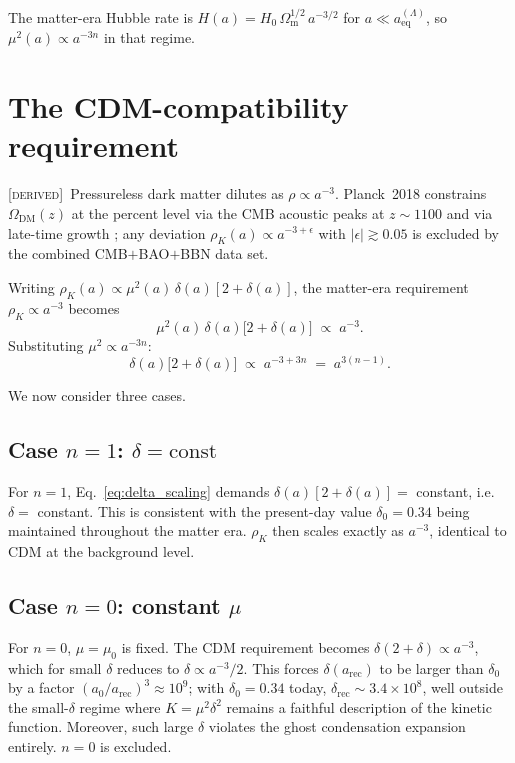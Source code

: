 \documentclass[prd,twocolumn,superscriptaddress,longbibliography,floatfix]{revtex4-2}
\newcommand{\Hzero}{H_{0}}
\newcommand{\muzero}{\mu_{0}}
\newcommand{\OmegaDM}{\Omega_{\mathrm{DM}}}
\newcommand{\Omegam}{\Omega_{\mathrm{m}}}
\newcommand{\derived}{\textsc{[derived]}}
\begin{document}
The matter-era Hubble rate is
$H(a) = \Hzero\,\Omegam^{1/2}\,a^{-3/2}$ for
$a \ll a_{\mathrm{eq}}^{(\Lambda)}$, so
$\mu^{2}(a) \propto a^{-3n}$ in that regime.

\section{The CDM-compatibility requirement}
\label{sec:cdm}

\derived\ Pressureless dark matter dilutes as
$\rho \propto a^{-3}$.  Planck~2018 constrains
$\OmegaDM(z)$ at the percent level via the CMB acoustic
peaks at $z \sim 1100$ and via late-time growth
\cite{Planck2018}; any deviation
$\rho_{K}(a) \propto a^{-3+\epsilon}$ with
$|\epsilon| \gtrsim 0.05$ is excluded by the combined
CMB$+$BAO$+$BBN data set.

Writing $\rho_{K}(a) \propto \mu^{2}(a)\,
\delta(a)[2+\delta(a)]$, the matter-era requirement
$\rho_{K} \propto a^{-3}$ becomes
\begin{equation}
\mu^{2}(a)\,\delta(a)\bigl[2+\delta(a)\bigr]
\;\propto\; a^{-3}.
\label{eq:CDM_req}
\end{equation}
Substituting $\mu^{2} \propto a^{-3n}$:
\begin{equation}
\delta(a)\bigl[2+\delta(a)\bigr] \;\propto\;
a^{-3+3n} \;=\; a^{3(n-1)}.
\label{eq:delta_scaling}
\end{equation}

We now consider three cases.

\subsection{Case $n = 1$: $\delta = \mathrm{const}$}

For $n = 1$, Eq.~\eqref{eq:delta_scaling} demands
$\delta(a)[2+\delta(a)] = $ constant, i.e.\ $\delta = $
constant.  This is consistent with the present-day
value $\delta_{0} = 0.34$ being maintained throughout
the matter era.  $\rho_{K}$ then scales exactly as
$a^{-3}$, identical to CDM at the background level.

\subsection{Case $n = 0$: constant $\mu$}

For $n = 0$, $\mu = \muzero$ is fixed.  The CDM
requirement becomes
$\delta(2+\delta) \propto a^{-3}$, which for small
$\delta$ reduces to $\delta \propto a^{-3}/2$.  This
forces $\delta(a_{\mathrm{rec}})$ to be larger than
$\delta_{0}$ by a factor
$(a_{0}/a_{\mathrm{rec}})^{3} \approx 10^{9}$; with
$\delta_{0} = 0.34$ today, $\delta_{\mathrm{rec}}
\sim 3.4 \times 10^{8}$, well outside the
small-$\delta$ regime where $K = \mu^{2}\delta^{2}$
remains a faithful description of the kinetic function.
Moreover, such large $\delta$ violates the ghost
condensation expansion entirely.  $n = 0$ is excluded.
\end{document}
